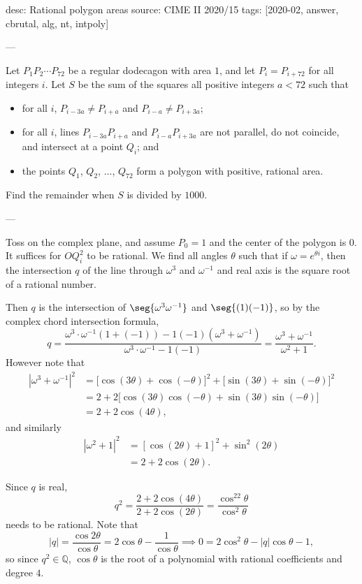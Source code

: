 desc: Rational polygon areas
source: CIME II 2020/15
tags: [2020-02, answer, cbrutal, alg, nt, intpoly]

---

Let $P_1P_2\cdots P_{72}$ be a regular dodecagon with area $1$, and let $P_i=P_{i+72}$ for all integers $i$. Let $S$ be the sum of the squares all positive integers $a<72$ such that
\begin{itemize}
    \item for all $i$, $P_{i-3a}\ne P_{i+a}$ and $P_{i-a}\ne P_{i+3a}$;
    \item for all $i$, lines $P_{i-3a}P_{i+a}$ and $P_{i-a}P_{i+3a}$ are not parallel, do not coincide, and intersect at a point $Q_i$; and
    \item the points $Q_1$, $Q_2$, $\ldots$, $Q_{72}$ form a polygon with positive, rational area.
\end{itemize}
Find the remainder when $S$ is divided by $1000$.

---

Toss on the complex plane, and assume $P_0=1$ and the center of the polygon is $0$. It suffices for $OQ_i^2$ to be rational. We find all angles $\theta$ such that if $\omega=e^{\theta i}$, then the intersection $q$ of the line through $\omega^3$ and $\omega^{-1}$ and real axis is the square root of a rational number.

Then $q$ is the intersection of $\seg{\omega^3\omega^{-1}}$ and $\seg{(1)(-1)}$, so by the complex chord intersection formula, \[q=\frac{\omega^3\cdot\omega^{-1}(1+(-1))-1(-1)(\omega^3+\omega^{-1})}{\omega^3\cdot\omega^{-1}-1(-1)}=\frac{\omega^3+\omega^{-1}}{\omega^2+1}.\]
However note that
\begin{align*}
    \left|\omega^3+\omega^{-1}\right|^2&=\big[\cos(3\theta)+\cos(-\theta)\big]^2+\big[\sin(3\theta)+\sin(-\theta)\big]^2\\
    &=2+2\big[\cos(3\theta)\cos(-\theta)+\sin(3\theta)\sin(-\theta)\big]\\
    &=2+2\cos(4\theta),
\end{align*}
and similarly
\begin{align*}
    \left|\omega^2+1\right|^2&=\left[\cos(2\theta)+1\right]^2+\sin^2(2\theta)\\
    &=2+2\cos(2\theta).
\end{align*}

Since $q$ is real, \[q^2=\frac{2+2\cos(4\theta)}{2+2\cos(2\theta)}=\frac{\cos^22\theta}{\cos^2\theta}\]
needs to be rational. Note that \[|q|=\frac{\cos2\theta}{\cos\theta}=2\cos\theta-\frac1{\cos\theta}\implies0=2\cos^2\theta-|q|\cos\theta-1,\]
so since $q^2\in\mathbb Q$, $\cos\theta$ is the root of a polynomial with rational coefficients and degree $4$.

